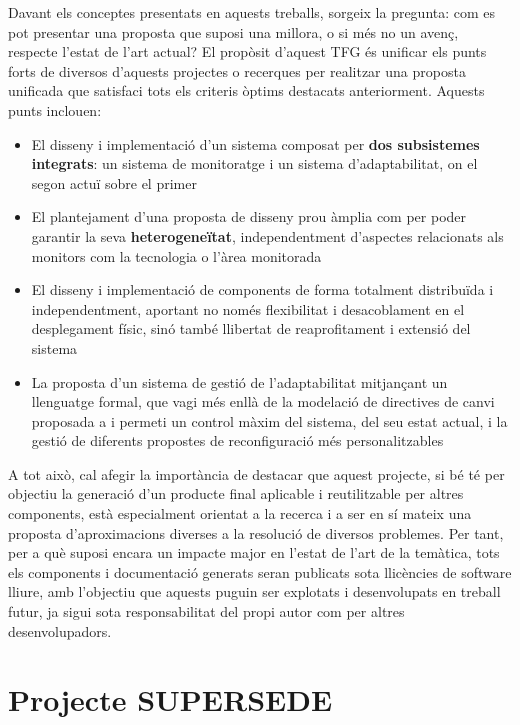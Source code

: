 Davant els conceptes presentats en aquests treballs, sorgeix la pregunta: com es pot presentar una proposta que suposi una millora, o si més no un avenç, respecte l'estat de l'art actual? El propòsit d'aquest TFG és unificar els punts forts de diversos d'aquests projectes o recerques per realitzar una proposta unificada que satisfaci tots els criteris òptims destacats anteriorment. Aquests punts inclouen:

\begin{itemize}
\item El disseny i implementació d'un sistema composat per \textbf{dos subsistemes integrats}: un sistema de monitoratge i un sistema d'adaptabilitat, on el segon actuï sobre el primer
\item El plantejament d'una proposta de disseny prou àmplia com per poder garantir la seva \textbf{heterogeneïtat}, independentment d'aspectes relacionats als monitors com la tecnologia o l'àrea monitorada
\item El disseny i implementació de components de forma totalment distribuïda i independentment, aportant no només flexibilitat i desacoblament en el desplegament físic, sinó també llibertat de reaprofitament i extensió del sistema
\item La proposta d'un sistema de gestió de l'adaptabilitat mitjançant un llenguatge formal, que vagi més enllà de la modelació de directives de canvi proposada a \cite{heterogeneous} i permeti un control màxim del sistema, del seu estat actual, i la gestió de diferents propostes de reconfiguració més personalitzables
\end{itemize}

A tot això, cal afegir la importància de destacar que aquest projecte, si bé té per objectiu la generació d'un producte final aplicable i reutilitzable per altres components, està especialment orientat a la recerca i a ser en sí mateix una proposta d'aproximacions diverses a la resolució de diversos problemes. Per tant, per a què suposi encara un impacte major en l'estat de l'art de la temàtica, tots els components i documentació generats seran publicats sota llicències de software lliure, amb l'objectiu que aquests puguin ser explotats i desenvolupats en treball futur, ja sigui sota responsabilitat del propi autor com per altres desenvolupadors.


\section{Projecte SUPERSEDE}

